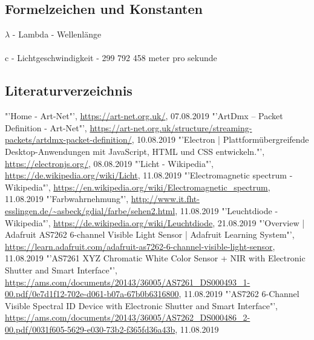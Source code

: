 \documentclass[11pt]{scrartcl}
\begin{document}
\subsection{Formelzeichen und Konstanten}
$\lambda$ - Lambda - Wellenlänge\\
\\
c - Lichtgeschwindigkeit - 299 792 458 meter pro sekunde
\clearpage

\subsection{Literaturverzeichnis}
\begingroup
\renewcommand{\section}[2]{}
\begin{thebibliography}{xxxxxxxxxxxxxxxxxxx}
    "'Home - Art-Net"', \url{https://art-net.org.uk/}, 07.08.2019
    "'ArtDmx – Packet Definition - Art-Net"', \url{https://art-net.org.uk/structure/streaming-packets/artdmx-packet-definition/}, 10.08.2019
    "'Electron | Plattformübergreifende Desktop-Anwendungen mit JavaScript, HTML und CSS entwickeln."', \url{https://electronjs.org/}, 08.08.2019
    "'Licht - Wikipedia"', \url{https://de.wikipedia.org/wiki/Licht}, 11.08.2019
    "'Electromagnetic spectrum - Wikipedia"', \url{https://en.wikipedia.org/wiki/Electromagnetic_spectrum}, 11.08.2019
    "'Farbwahrnehmung"', \url{http://www.it.fht-esslingen.de/~asbeck/gdial/farbe/sehen2.html}, 11.08.2019
    "'Leuchtdiode - Wikipedia"', \url{https://de.wikipedia.org/wiki/Leuchtdiode}, 21.08.2019
    "'Overview | Adafruit AS7262 6-channel Visible Light Sensor | Adafruit Learning System"', \url{https://learn.adafruit.com/adafruit-as7262-6-channel-visible-light-sensor}, 11.08.2019
    "'AS7261 XYZ Chromatic White Color Sensor + NIR with Electronic Shutter and Smart Interface"', \url{https://ams.com/documents/20143/36005/AS7261_DS000493_1-00.pdf/0e7d1f12-702e-d061-b07a-67b0b6316800}, 11.08.2019
    "'AS7262 6-Channel Visible Spectral ID Device with Electronic Shutter and Smart Interface"', \url{https://ams.com/documents/20143/36005/AS7262_DS000486_2-00.pdf/0031f605-5629-e030-73b2-f365fd36a43b}, 11.08.2019
 \end{thebibliography}
 \endgroup
\clearpage
\end{document}
